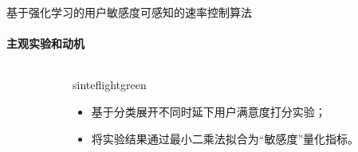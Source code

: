 \documentclass{beamer}
\begin{document}
\begin{frame}[fragile]{基于强化学习的用户敏感度可感知的速率控制算法}
\framesubtitle{主观实验和动机}
    \begin{columns}
        \begin{column}{0.65\textwidth}
                
        \end{column}

        \begin{column}{0.35\textwidth}             
            \begin{colorblock}[black]{sinteflightgreen}{}
                \begin{itemize}
                    \item 基于分类展开不同时延下用户满意度打分实验；
                    \item 将实验结果通过最小二乘法拟合为“敏感度”量化指标。
                \end{itemize}
            \end{colorblock}
        \end{column}
    \end{columns}



\end{frame}
\end{document}
